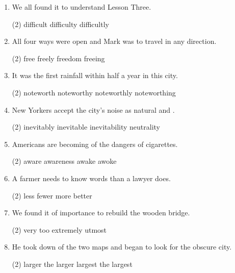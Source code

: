 \begin{enumerate}
\item We all found it \ttu to understand Lesson Three.
  \begin{tasks}(2)
    \task difficult
    \task difficulty
    \task difficultly
  \end{tasks}

\item All four ways were open and Mark was \ttu to travel in any direction.
  \begin{tasks}(2)
    \task free
    \task freely
    \task freedom
    \task freeing
  \end{tasks}

\item It was the first \ttu rainfall within half a year in this city.
  \begin{tasks}(2)
    \task noteworth
    \task noteworthy
    \task noteworthly
    \task noteworthing
  \end{tasks}

\item New Yorkers accept the city's noise as natural and \ttu.
  \begin{tasks}(2)
    \task inevitably
    \task inevitable
    \task inevitability
    \task neutrality
  \end{tasks}

\item Americans are becoming \ttu of the dangers of cigarettes.
  \begin{tasks}(2)
    \task aware
    \task awareness
    \task awake
    \task awoke
  \end{tasks}

\item A farmer needs to know \ttu words than a lawyer does.
  \begin{tasks}(2)
    \task less
    \task fewer
    \task more
    \task better
  \end{tasks}

\item We found it of \ttu importance to rebuild the wooden bridge.
  \begin{tasks}(2)
    \task very
    \task too
    \task extremely
    \task utmost
  \end{tasks}

\item He took down \ttu of the two maps and began to look for the obscure city.
  \begin{tasks}(2)
    \task larger
    \task the larger
    \task largest
    \task the largest
  \end{tasks}


\end{enumerate}
